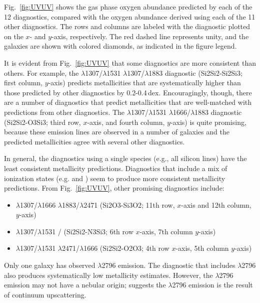 Fig.~\ref{fig:UVUV} shows the gas phase oxygen abundance predicted by each of the 12 diagnostics, compared with the oxygen abundance derived using each of the 11 other diagnostics. The rows and columns are labeled with the diagnostic plotted on the $x$- and $y$-axis, respectively. The red dashed line represents unity, and the \mage galaxies are shown with colored diamonds, as indicated in the figure legend.

It is evident from Fig.~\ref{fig:UVUV} that some diagnostics are more consistent than others. For example, the \SiuII$\lambda$1307/\SiuII$\lambda$1531 \vs \SiuII$\lambda$1307/\SiuIII$\lambda$1883 diagnostic (Si2Si2-Si2Si3; first column, $y$-axis) predicts metallicities that are systematically higher than those predicted by other diagnostics by 0.2-0.4\,dex. Encouragingly, though, there are a number of diagnostics that predict metallicities that are well-matched with predictions from other diagnostics. The \SiuII$\lambda$1307/\SiuII$\lambda$1531 \vs \oiii$\lambda$1666/\SiuIII$\lambda$1883 diagnostic (Si2Si2-O3Si3; third row, $x$-axis, and fourth column, $y$-axis) is quite promising, because these emission lines are observed in a number of galaxies and the predicted metallicities agree with several other diagnostics.

In general, the diagnostics using a single species (e.g., all silicon lines) have the least consistent metallicity predictions. Diagnostics that include a mix of ionization states (e.g. \oiii and \oii) seem to produce more consistent metallicity predictions. From Fig.~\ref{fig:UVUV}, other promising diagnostics include:
\begin{itemize}
    \item \SiuII$\lambda$1307/\oiii$\lambda$1666 \vs \SiuIII$\lambda$1883/\oii$\lambda$2471 (Si2O3-Si3O2; 11th row, $x$-axis and 12th column, $y$-axis)
    \item \SiuII$\lambda$1307/\SiuII$\lambda$1531 \vs {}/ (Si2Si2-N3Si3; 6th row $x$-axis, 7th column $y$-axis)
    \item \SiuII$\lambda$1307/\SiuII$\lambda$1531 \vs \oii$\lambda$2471/\oiii$\lambda$1666 (Si2Si2-O2O3; 4th row $x$-axis, 5th column $y$-axis)
\end{itemize}

Only one galaxy has observed \mgii$\lambda$2796 emission. The diagnostic that includes \mgii$\lambda$2796 also produces systematically low metallicity estimates. However, the \mgii$\lambda$2796 emission may not have a nebular origin; \citet{Rigby+2018a} suggests the \mgii$\lambda$2796 emission is the result of continuum upscattering.

